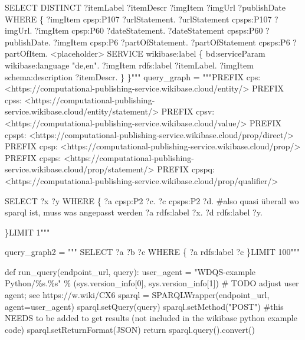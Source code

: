 \documentclass[
  letterpaper,
]{book}
\newenvironment{Shaded}{\begin{snugshade}}{\end{snugshade}}
\newcommand{\AlertTok}[1]{\textcolor[rgb]{0.68,0.00,0.00}{#1}}
\newcommand{\CommentTok}[1]{\textcolor[rgb]{0.37,0.37,0.37}{#1}}
\newcommand{\ControlFlowTok}[1]{\textcolor[rgb]{0.00,0.23,0.31}{#1}}
\newcommand{\DecValTok}[1]{\textcolor[rgb]{0.68,0.00,0.00}{#1}}
\newcommand{\KeywordTok}[1]{\textcolor[rgb]{0.00,0.23,0.31}{#1}}
\newcommand{\NormalTok}[1]{\textcolor[rgb]{0.00,0.23,0.31}{#1}}
\newcommand{\OperatorTok}[1]{\textcolor[rgb]{0.37,0.37,0.37}{#1}}
\newcommand{\SpecialCharTok}[1]{\textcolor[rgb]{0.37,0.37,0.37}{#1}}
\newcommand{\StringTok}[1]{\textcolor[rgb]{0.13,0.47,0.30}{#1}}
\begin{document}
\begin{Shaded}
\begin{Highlighting}[]
\StringTok{SELECT DISTINCT ?itemLabel ?itemDescr ?imgItem ?imgUrl ?publishDate }
\StringTok{WHERE}
\StringTok{\{}
\StringTok{  ?imgItem cpsp:P107 ?urlStatement. }
\StringTok{  ?urlStatement cpsps:P107 ?imgUrl. }
\StringTok{  ?imgItem cpsp:P60 ?dateStatement.         }
\StringTok{  ?dateStatement cpsps:P60 ?publishDate.}
\StringTok{  ?imgItem cpsp:P6 ?partOfStatement.}
\StringTok{  ?partOfStatement cpsps:P6 ?partOfItem.}
\StringTok{  \textless{}placeholder\textgreater{} }
\StringTok{  SERVICE wikibase:label \{}
\StringTok{      bd:serviceParam wikibase:language "de,en".}
\StringTok{      ?imgItem rdfs:label ?itemLabel.}
\StringTok{      ?imgItem schema:description ?itemDescr.}
\StringTok{    \}}
\StringTok{\}"""}
\NormalTok{query\_graph }\OperatorTok{=} \StringTok{"""PREFIX cps: \textless{}https://computational{-}publishing{-}service.wikibase.cloud/entity/\textgreater{}}
\StringTok{PREFIX cpss: \textless{}https://computational{-}publishing{-}service.wikibase.cloud/entity/statement/\textgreater{}}
\StringTok{PREFIX cpsv: \textless{}https://computational{-}publishing{-}service.wikibase.cloud/value/\textgreater{}}
\StringTok{PREFIX cpspt: \textless{}https://computational{-}publishing{-}service.wikibase.cloud/prop/direct/\textgreater{}}
\StringTok{PREFIX cpsp: \textless{}https://computational{-}publishing{-}service.wikibase.cloud/prop/\textgreater{}}
\StringTok{PREFIX cpsps: \textless{}https://computational{-}publishing{-}service.wikibase.cloud/prop/statement/\textgreater{}}
\StringTok{PREFIX cpspq: \textless{}https://computational{-}publishing{-}service.wikibase.cloud/prop/qualifier/\textgreater{}}

\StringTok{SELECT ?x ?y}
\StringTok{WHERE}
\StringTok{\{}
\StringTok{  ?a cpsp:P2 ?c.}
\StringTok{  ?c cpsps:P2 ?d.                       \#also quasi überall wo sparql ist, muss was angepasst werden}
\StringTok{  ?a rdfs:label ?x.}
\StringTok{  ?d rdfs:label ?y.}

\StringTok{\}LIMIT 1"""}

\NormalTok{query\_graph2 }\OperatorTok{=} \StringTok{"""}
\StringTok{SELECT ?a ?b ?c}
\StringTok{WHERE}
\StringTok{\{}
\StringTok{  ?a rdfs:label ?c}
\StringTok{\}LIMIT 100"""}


\KeywordTok{def}\NormalTok{ run\_query(endpoint\_url, query):}
\NormalTok{    user\_agent }\OperatorTok{=} \StringTok{"WDQS{-}example Python/}\SpecialCharTok{\%s}\StringTok{.}\SpecialCharTok{\%s}\StringTok{"} \OperatorTok{\%}\NormalTok{ (sys.version\_info[}\DecValTok{0}\NormalTok{], sys.version\_info[}\DecValTok{1}\NormalTok{])}
    \CommentTok{\# }\AlertTok{TODO}\CommentTok{ adjust user agent; see https://w.wiki/CX6}
\NormalTok{    sparql }\OperatorTok{=}\NormalTok{ SPARQLWrapper(endpoint\_url, agent}\OperatorTok{=}\NormalTok{user\_agent)}
\NormalTok{    sparql.setQuery(query)}
\NormalTok{    sparql.setMethod(}\StringTok{"POST"}\NormalTok{) }\CommentTok{\#this NEEDS to be added to get results (not included in the wikibase python example code)}
\NormalTok{    sparql.setReturnFormat(JSON)}
    \ControlFlowTok{return}\NormalTok{ sparql.query().convert()}


\end{Highlighting}
\end{Shaded}
\end{document}
